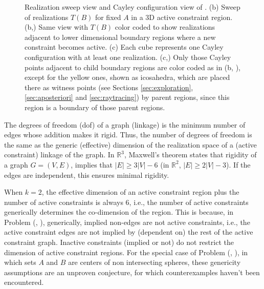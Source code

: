 \begin{figure}[h]
\centering
\caption{ Realization sweep view and Cayley configuration view of \exref{\bighelix}.
(b) Sweep of realizations $T(B)$ for fixed $A$ in a 3D active constraint
region. (b,\IR) Same view with $T(B)$ color coded to show
realizations adjacent to lower dimensional boundary regions where a new
constraint becomes active.
(c) Each cube represents one Cayley configuration with
at least one realization. %
(c,\IR) Only those Cayley points adjacent to child boundary regions are color coded as in (b, \IR),
except for the yellow ones, shown as icosahedra, which are placed there as
witness points (see Sections \ref{sec:exploration}, \ref{sec:aposteriori} and \ref{sec:raytracing}) 
by parent regions, since this region is a boundary of those parent regions.
}
\label{fig:boundarySweeps}
\end{figure}

The degrees of freedom (dof) of a graph (linkage) is the minimum number of
edges whose addition makes it rigid. Thus, the number of degrees of freedom is
the same as the generic (effective) dimension of the realization space of a
(active constraint) linkage of the graph. In $\mathbb{R}^3$, Maxwell's theorem
\cite{maxwell} states that rigidity of a graph $G=(V,E)$, implies that $|E| \ge
3|V| - 6$ (in $\mathbb{R}^2$, $|E| \ge 2|V| - 3$). If the edges are
independent, this ensures minimal rigidity.

When $k=2$, the effective dimension of an active constraint region plus the
number of active constraints is always 6, i.e., the number of active
constraints generically determines the co-dimension of the region. This is
because, in Problem (\cone, \ctwo), generically, implied non-edges are not active constraints, i.e., the
active constraint edges are not implied by (dependent on) the rest of the
active constraint graph. Inactive constraints (implied or not) do not restrict
the dimension of active constraint regions. For the special case of Problem
(\cone, \ctwo), in which sets $A$ and $B$ are centers of non intersecting 
spheres, these genericity assumptions are an unproven conjecture, for which
counterexamples haven't been encountered.

